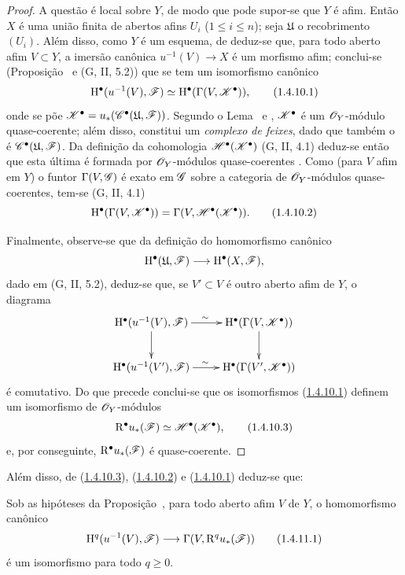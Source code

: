 \begin{proof}
A questão é local sobre $Y$, de modo que pode supor-se que $Y$ é afim.
Então $X$ é uma união finita de abertos afins $U_i$ ($1\leq i\leq n$); seja $\mathfrak{U}$ o recobrimento $(U_i)$.
Além disso, como $Y$ é um esquema, de  deduz-se que, para todo aberto afim $V\subset Y$, a imersão canônica $u^{-1}(V)\to X$ é um morfismo afim; conclui-se (Proposição~ e (G, II, 5.2)) que se tem um isomorfismo canônico
\[
  \HH^\bullet(u^{-1}(V),\sh{F})\isoto\HH^\bullet(\Gamma(V,\sh{K}^\bullet)),
  \tag{1.4.10.1}\label{III.1.4.10.1}
\]
onde se põe $\mathscr{K}^\bullet=u_*(\mathscr{C}^\bullet(\mathfrak{U},\mathscr{F}))$.
Segundo o Lema~ e , $\mathscr{K}^\bullet$ é um $\mathscr{O}_Y$-módulo quase-coerente; além disso, constitui um \emph{complexo de feixes}, dado que também o é $\mathscr{C}^\bullet(\mathfrak{U},\mathscr{F})$.
Da definição da cohomologia $\mathscr{H}^\bullet(\mathscr{K}^\bullet)$ (G, II, 4.1) deduz-se então que esta última é formada por $\mathscr{O}_Y$-módulos quase-coerentes .
Como (para $V$ afim em $Y$) o funtor $\Gamma(V,\mathscr{G})$ é exato em $\mathscr{G}$ sobre a categoria de $\mathscr{O}_Y$-módulos quase-coerentes, tem-se (G, II, 4.1)
\[
  \HH^\bullet(\Gamma(V,\sh{K}^\bullet))=\Gamma(V,\sh{H}^\bullet(\sh{K}^\bullet)).
  \tag{1.4.10.2}\label{III.1.4.10.2}
\]

Finalmente, observe-se que da definição do homomorfismo canônico
\[
  \HH^\bullet(\mathfrak{U},\sh{F})\to\HH^\bullet(X,\sh{F}),
\]
dado em (G, II, 5.2), deduz-se que, se $V'\subset V$ é outro aberto afim de $Y$, o
diagrama
\[
  \xymatrix{
    \HH^\bullet(u^{-1}(V),\sh{F})\ar[r]^\sim\ar[d] &
    \HH^\bullet(\Gamma(V,\sh{K}^\bullet))\ar[d]\\
    \HH^\bullet(u^{-1}(V'),\sh{F})\ar[r]^\sim &
    \HH^\bullet(\Gamma(V',\sh{K}^\bullet))
  }
\]
é comutativo.
Do que precede conclui-se que os isomorfismos (\hyperref[III.1.4.10.1]{1.4.10.1}) definem um isomorfismo de $\mathscr{O}_Y$-módulos
\[
  \RR^\bullet u_*(\sh{F})\isoto\sh{H}^\bullet(\sh{K}^\bullet),
  \tag{1.4.10.3}\label{III.1.4.10.3}
\]
e, por conseguinte, $\mathrm{R}^\bullet u_*(\mathscr{F})$ é quase-coerente.
\end{proof}

Além disso, de (\hyperref[III.1.4.10.3]{1.4.10.3}), (\hyperref[III.1.4.10.2]{1.4.10.2}) e (\hyperref[III.1.4.10.1]{1.4.10.1}) deduz-se que:
\begin{corollary}[1.4.11]
\label{III.1.4.11}
Sob as hipóteses da Proposição~, para todo aberto afim $V$ de $Y$, o homomorfismo canônico
\[
  \HH^q(u^{-1}(V),\sh{F})\to\Gamma(V,\RR^q u_*(\sh{F}))
  \tag{1.4.11.1}\label{III.1.4.11.1}
\]
é um isomorfismo para todo $q\geq 0$.
\end{corollary}

